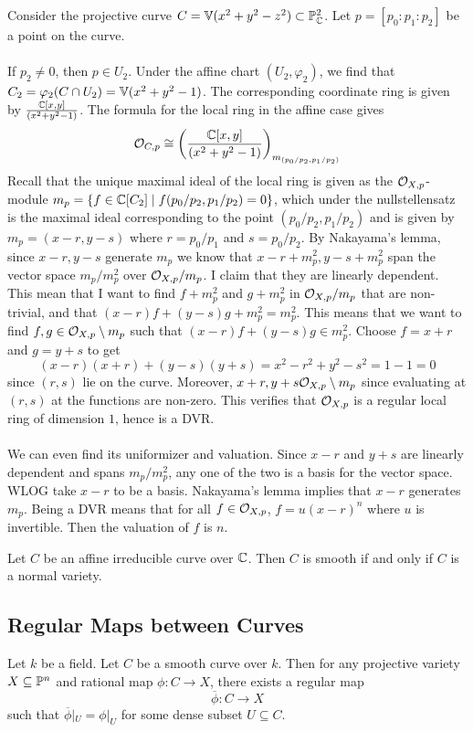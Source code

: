 \documentclass[a4paper]{article}
\begin{document}
\begin{eg}{}{} Consider the projective curve $C=\mathbb{V}(x^2+y^2-z^2)\subset\mathbb{P}_{\mathbb{C}}^2$. Let $p=[p_0:p_1:p_2]$ be a point on the curve. \\~\\

If $p_2\neq 0$, then $p\in U_2$. Under the affine chart $(U_2,\varphi_2)$, we find that $C_2=\varphi_2(C\cap U_2)=\mathbb{V}(x^2+y^2-1)$. The corresponding coordinate ring is given by $\frac{\mathbb{C}[x,y]}{(x^2+y^2-1)}$. The formula for the local ring in the affine case gives $$\mathcal{O}_{C,p}\cong\left(\frac{\mathbb{C}[x,y]}{(x^2+y^2-1)}\right)_{m_{(p_0/p_2,p_1/p_2)}}$$ Recall that the unique maximal ideal of the local ring is given as the $\mathcal{O}_{X,p}$-module $m_p=\{f\in\mathbb{C}[C_2]\;|\;f(p_0/p_2,p_1/p_2)=0\}$, which under the nullstellensatz is the maximal ideal corresponding to the point $(p_0/p_2,p_1/p_2)$ and is given by $m_p=(x-r,y-s)$ where $r=p_0/p_1$ and $s=p_0/p_2$. By Nakayama's lemma, since $x-r,y-s$ generate $m_p$ we know that $x-r+m_p^2,y-s+m_p^2$ span the vector space $m_p/m_p^2$ over $\mathcal{O}_{X,p}/m_p$. I claim that they are linearly dependent. This mean that I want to find $f+m_p^2$ and $g+m_p^2$ in $\mathcal{O}_{X,p}/m_p$ that are non-trivial, and that $(x-r)f+(y-s)g+m_p^2=m_p^2$. This means that we want to find $f,g\in\mathcal{O}_{X,p}\setminus m_p$ such that $(x-r)f+(y-s)g\in m_p^2$. Choose $f=x+r$ and $g=y+s$ to get $$(x-r)(x+r)+(y-s)(y+s)=x^2-r^2+y^2-s^2=1-1=0$$ since $(r,s)$ lie on the curve. Moreover, $x+r,y+s\mathcal{O}_{X,p}\setminus m_p$ since evaluating at $(r,s)$ at the functions are non-zero. This verifies that $\mathcal{O}_{X,p}$ is a regular local ring of dimension $1$, hence is a DVR. \\~\\

We can even find its uniformizer and valuation. Since $x-r$ and $y+s$ are linearly dependent and spans $m_p/m_p^2$, any one of the two is a basis for the vector space. WLOG take $x-r$ to be a basis. Nakayama's lemma implies that $x-r$ generates $m_p$. Being a DVR means that for all $f\in\mathcal{O}_{X,p}$, $f=u(x-r)^n$ where $u$ is invertible. Then the valuation of $f$ is $n$. 
\end{eg}

\begin{prp}{}{} Let $C$ be an affine irreducible curve over $\mathbb{C}$. Then $C$ is smooth if and only if $C$ is a normal variety. 
\end{prp}

\subsection{Regular Maps between Curves}
\begin{prp}{}{} Let $k$ be a field. Let $C$ be a smooth curve over $k$. Then for any projective variety $X\subseteq\mathbb{P}^n$ and rational map $\phi:C\to X$, there exists a regular map $$\overline{\phi}:C\to X$$ such that $\overline{\phi}|_U=\phi|_U$ for some dense subset $U\subseteq C$. 
\end{prp}
\end{document}
